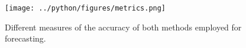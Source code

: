 \documentclass[11pt, a4paper, leqno]{article}
\begin{document}
\begin{figure}[H]

    \centering
    \texttt{[image: ../python/figures/metrics.png]}

    \caption{Different measures of the accuracy of both methods employed for forecasting.}
    \label{fig:measures}

\end{figure}





\printbibliography
{}
\end{document}
